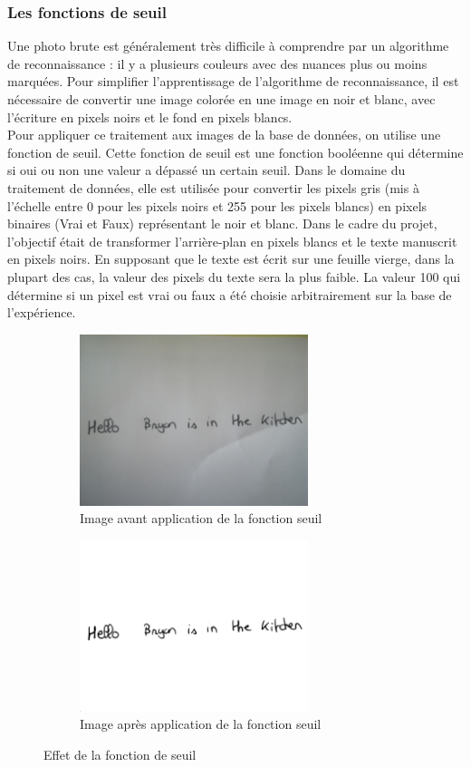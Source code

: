 \documentclass[oneside,a4paper,13pt]{article}
\begin{document}
\subsubsection{Les fonctions de seuil}
Une photo brute est généralement très difficile à comprendre par un algorithme de reconnaissance : il y a plusieurs couleurs avec des nuances plus ou moins marquées. Pour simplifier l'apprentissage de l'algorithme de reconnaissance, il est nécessaire de convertir une image colorée en une image en noir et blanc, avec l'écriture en pixels noirs et le fond en pixels blancs. \\
Pour appliquer ce traitement aux images de la base de données, on utilise une fonction de seuil. Cette fonction de seuil est une fonction booléenne qui détermine si oui ou non une valeur a dépassé un certain seuil. Dans le domaine du traitement de données, elle est utilisée pour convertir les pixels gris (mis à l'échelle entre 0 pour les pixels noirs et 255 pour les pixels blancs) en pixels binaires (Vrai et Faux) représentant le noir et blanc. Dans le cadre du projet, l'objectif était de transformer l'arrière-plan en pixels blancs et le texte manuscrit en pixels noirs. En supposant que le texte est écrit sur une feuille vierge, dans la plupart des cas, la valeur des pixels du texte sera la plus faible. La valeur 100 qui détermine si un pixel est vrai ou faux a été choisie arbitrairement sur la base de l'expérience.
\begin{figure}[H]

\begin{subfigure}{0.5\textwidth}
\includegraphics[width=0.9\linewidth,height=5cm]{Images/testCodev.jpg} 
\caption{Image avant application de la fonction seuil}
\label{fig:subim1}
\end{subfigure}
\begin{subfigure}{0.5\textwidth}
\includegraphics[width=0.9\linewidth, height=5cm]{Images/th_img.png}
\caption{Image après application de la fonction seuil}
\label{fig:subim2}
\end{subfigure}

\caption{Effet de la fonction de seuil}
\label{fig:image1}
\end{figure}
\end{document}
